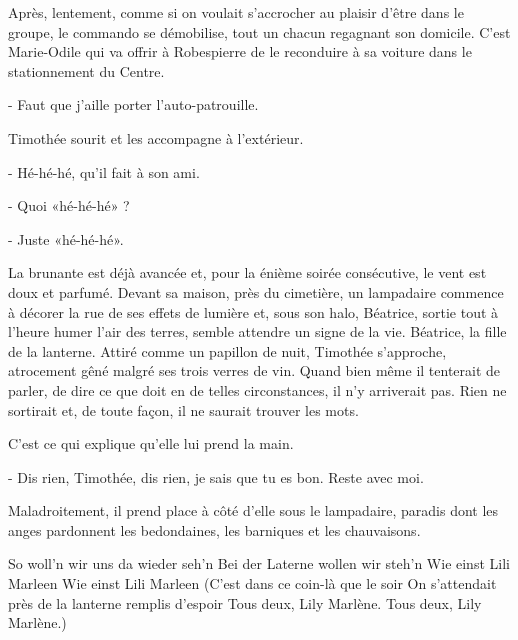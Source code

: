 Après, lentement, comme si on voulait s’accrocher au plaisir d’être dans le groupe, le commando se démobilise, tout un chacun regagnant son domicile. C’est Marie-Odile qui va offrir à Robespierre de le reconduire à sa voiture dans le stationnement du Centre.

- Faut que j’aille porter l’auto-patrouille.

Timothée sourit et les accompagne à l’extérieur.

- Hé-hé-hé, qu’il fait à son ami.

- Quoi «hé-hé-hé» ?

- Juste «hé-hé-hé».

La brunante est déjà avancée et, pour la énième soirée consécutive, le vent est doux et parfumé. Devant sa maison, près du cimetière, un lampadaire commence à décorer la rue de ses effets de lumière et, sous son halo, Béatrice, sortie tout à l’heure humer l’air des terres, semble attendre un signe de la vie. Béatrice, la fille de la lanterne. Attiré comme un papillon de nuit, Timothée s’approche, atrocement gêné malgré ses trois verres de vin. Quand bien même il tenterait de parler, de dire ce que doit en de telles circonstances, il n’y arriverait pas. Rien ne sortirait et, de toute façon, il ne saurait trouver les mots.

C’est ce qui explique qu’elle lui prend la main.

- Dis rien, Timothée, dis rien, je sais que tu es bon. Reste avec moi.

Maladroitement, il prend place à côté d’elle sous le lampadaire, paradis dont les anges pardonnent les bedondaines, les barniques et les chauvaisons.

    So woll’n wir uns da wieder seh’n
    Bei der Laterne wollen wir steh’n
    Wie einst Lili Marleen
    Wie einst Lili Marleen
    (C’est dans ce coin-là que le soir
    On s’attendait près de la lanterne remplis d’espoir
    Tous deux, Lily Marlène.
    Tous deux, Lily Marlène.)

